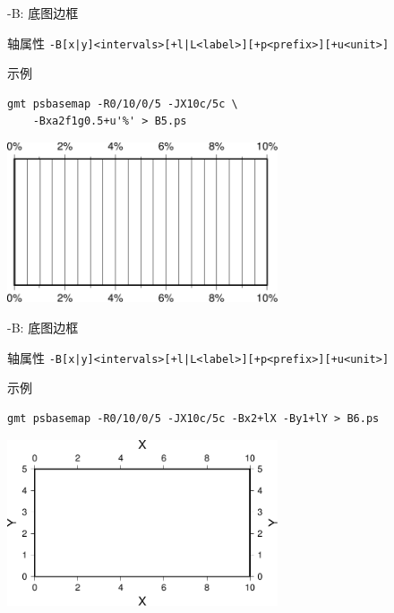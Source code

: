 \documentclass[UTF8, 11pt]{ctexbeamer}
\begin{document}
\begin{frame}[fragile]{-B: 底图边框}
\begin{block}{轴属性}
\small{\verb!-B[x|y]<intervals>[+l|L<label>][+p<prefix>][+u<unit>]!}
\end{block}
\begin{block}{示例}
\centering
\small\begin{verbatim}
gmt psbasemap -R0/10/0/5 -JX10c/5c \
    -Bxa2f1g0.5+u'%' > B5.ps
\end{verbatim}
\includegraphics[width=0.6\textwidth]{GMT_B_example_5}
\end{block}
\end{frame}

\begin{frame}[fragile]{-B: 底图边框}
\begin{block}{轴属性}
\small{\verb!-B[x|y]<intervals>[+l|L<label>][+p<prefix>][+u<unit>]!}
\end{block}
\begin{block}{示例}
\centering
\small\begin{verbatim}
gmt psbasemap -R0/10/0/5 -JX10c/5c -Bx2+lX -By1+lY > B6.ps
\end{verbatim}
\includegraphics[width=0.6\textwidth]{GMT_B_example_6}
\end{block}
\end{frame}
\end{document}
